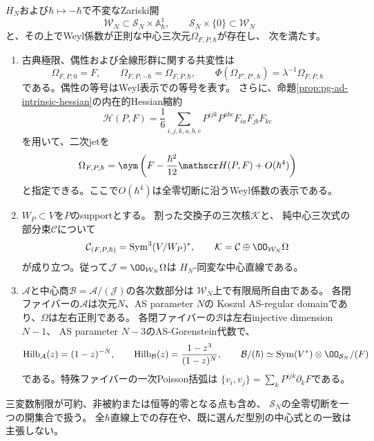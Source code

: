 \begin{theorem}[全階数二係数空間上の同変中心元]
\label{thm:pg-intrinsic-rank-two-center}
$H_N$および$\hbar\mapsto-\hbar$で不変なZariski開
\begin{equation}
 \mathcal W_N\subset\mathcal S_N\times\mathbb A^1_\hbar,
 \qquad \mathcal S_N\times\{0\}\subset\mathcal W_N
 \label{eq:pg-intrinsic-rank-two-open}
\end{equation}
と、その上でWeyl係数が正則な中心三次元$\Omega_{F,P,\hbar}$が存在し、
次を満たす。
\begin{enumerate}
\item 古典極限、偶性および全線形群に関する共変性は
\begin{equation}
 \Omega_{F,P,0}=F,\qquad
 \Omega_{F,P,-\hbar}=\Omega_{F,P,\hbar},\qquad
 \Phi(\Omega_{F',P',\hbar})
       =\lambda^{-1}\Omega_{F,P,\hbar}
 \label{eq:pg-intrinsic-rank-two-covariance}
\end{equation}
である。偶性の等号はWeyl表示での等号を表す。
さらに、命題\ref{prop:pg-ad-intrinsic-hessian}の内在的Hessian縮約
\begin{equation}
 \mathscr H(P,F)=\frac16\sum_{i,j,k,a,b,c}
 P^{ijk}P^{abc}F_{ia}F_{jb}F_{kc}
 \label{eq:pg-intrinsic-prescribed-hessian}
\end{equation}
を用いて、二次jetを
\begin{equation}
 \Omega_{F,P,\hbar}
   =\sym\left(F-\frac{\hbar^2}{12}\mathscr H(P,F)+O(\hbar^4)\right)
 \label{eq:pg-intrinsic-prescribed-second-jet}
\end{equation}
と指定できる。ここで$O(\hbar^4)$は全零切断に沿うWeyl係数の表示である。
\item $W_P\subset V$を$P$のsupportとする。
割った交換子の三次核$\mathcal K$と、
純中心三次式の部分束$\mathcal C$について
\begin{equation}
 \mathcal C_{(F,P,\hbar)}
   =\operatorname{Sym}^3(V/W_P)^*,\qquad
 \mathcal K=\mathcal C\oplus\OO_{\mathcal W_N}\Omega
 \label{eq:pg-intrinsic-rank-two-kernel-splitting}
\end{equation}
が成り立つ。従って$\mathcal J=\OO_{\mathcal W_N}\Omega$は
$H_N$-同変な中心直線である。
\item $\mathcal A$と中心商$\mathcal B=\mathcal A/(\mathcal J)$の各次数部分は
$\mathcal W_N$上で有限局所自由である。
各閉ファイバーの$\mathcal A$は次元$N$、AS parameter $N$の
Koszul AS-regular domainであり、$\Omega$は左右正則である。
各閉ファイバーの$\mathcal B$は左右injective dimension $N-1$、
AS parameter $N-3$のAS-Gorenstein代数で、
\begin{equation}
 \operatorname{Hilb}_{\mathcal A}(z)=(1-z)^{-N},\qquad
 \operatorname{Hilb}_{\mathcal B}(z)=\frac{1-z^3}{(1-z)^N},\qquad
 \mathcal B/(\hbar)\simeq
 \operatorname{Sym}(V^*)\otimes\OO_{\mathcal S_N}/(F)
 \label{eq:pg-intrinsic-rank-two-quotient}
\end{equation}
である。特殊ファイバーの一次Poisson括弧は
$\{v_i,v_j\}=\sum_kP^{ijk}\partial_kF$である。
\end{enumerate}
三変数制限が可約、非被約または恒等的零となる点も含め、
$\mathcal S_N$の全零切断を一つの開集合で扱う。
全$\hbar$直線上での存在や、既に選んだ型別の中心式との一致は主張しない。
\end{theorem}

